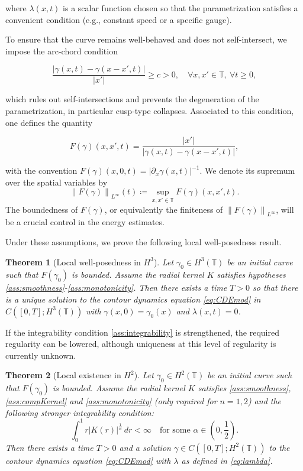 \documentclass[a4paper]{amsart}
\newtheorem{theorem}{Theorem}[section]
\theoremstyle{definition}
\newcommand{\T}{\ensuremath{\mathbb{T}}}
\newcommand{\Np}[2][\infty]{\ensuremath{\left\|#2\right\|_{L^#1}}}
\begin{document}
where \(\lambda(x,t)\) is a scalar function chosen so that the parametrization satisfies a convenient condition (e.g., constant speed or a specific gauge).

To ensure that the curve remains well-behaved and does not self-intersect, we impose the arc-chord condition

\begin{equation}\label{eq:arcChord}
    \frac{|\gamma(x,t)-\gamma(x-x',t)|}{|x'|}\geq c >0,\quad \forall x,x'\in \mathbb{T},\ \forall t\geq 0,
\end{equation}

which rules out self-intersections and prevents the degeneration of the parametrization, in particular cusp-type collapses. Associated to this condition, one defines the quantity

\begin{equation}\label{eq:F}
    F(\gamma)(x,x',t)=\frac{|x'|}{|\gamma(x,t)-\gamma(x-x',t)|},
\end{equation}

with the convention \(F(\gamma)(x,0,t)=|\partial_x\gamma(x,t)|^{-1}\). We denote its supremum over the spatial variables by
\[
\Np{F(\gamma)}(t) \coloneqq \sup_{x,x'\in\mathbb{T}} F(\gamma)(x,x',t).
\]
The boundedness of \(F(\gamma)\), or equivalently the finiteness of \(\Np{F(\gamma)}\), will be a crucial control in the energy estimates.

Under these assumptions, we prove the following local well-posedness result.

\begin{theorem}[Local well-posedness in \(H^3\)]\label{thm:H3}
Let \(\gamma_0 \in H^3(\mathbb{T})\) be an initial curve such that \(F(\gamma_0)\) is bounded. Assume the radial kernel \(K\) satisfies hypotheses \ref{ass:smoothness}-\ref{ass:monotonicity}. Then there exists a time \(T > 0\) so that there is a unique solution to the contour dynamics equation \eqref{eq:CDEmod} in $C([0,T]; H^3(\T))$ with $\gamma(x,0) = \gamma_0(x)$ and $\lambda(x,t)=0$.
\end{theorem}

If the integrability condition \ref{ass:integrability} is strengthened, the required regularity can be lowered, although uniqueness at this level of regularity is currently unknown.

\begin{theorem}[Local existence in \(H^2\)]\label{thm:H2}
Let \(\gamma_0 \in H^2(\mathbb{T})\) be an initial curve such that \(F(\gamma_0)\) is bounded. Assume the radial kernel \(K\) satisfies \ref{ass:smoothness}, \ref{ass:compKernel} and \ref{ass:monotonicity} (only required for $n=1,2$) and the following stronger integrability condition:
\begin{equation}\label{ass:strong-integrability}\tag{A2'}
\int_0^1 r| K(r)|^{\frac{1}{\alpha}} \, dr < \infty \quad \text{for some } \alpha \in \left(0,\frac{1}{2}\right).
\end{equation}
Then there exists a time \(T > 0\) and a solution \(\gamma \in C([0,T]; H^2(\T))\) to the contour dynamics equation \eqref{eq:CDEmod} with $\lambda$ as defined in \eqref{eq:lambda}.
\end{theorem}
\end{document}
